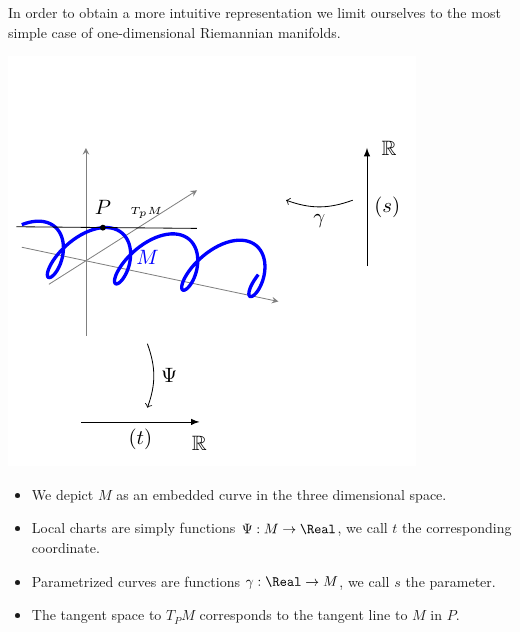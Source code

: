 \documentclass[Main]{subfiles}
\begin{document}
		\vspace{2mm}
		In order to obtain a more intuitive representation we limit ourselves to the most simple case of one-dimensional Riemannian manifolds.

		\vspace{1mm}		
		\begin{minipage}{0.5\textwidth}
			\includegraphics[width=\textwidth]{Pictures/Jacobi1D_GeometricPicture0}
		\end{minipage}
		\begin{minipage}{0.5\textwidth}
			\begin{itemize}
				\item We depict $M$ as an embedded curve in the three dimensional space.
				\item Local charts are simply functions $\Psi: M \rightarrow \Real$, we call $t$ the corresponding coordinate.
				\item Parametrized curves are functions $\gamma: \Real \rightarrow M$, we call $s$ the parameter.
				\item The tangent space to $T_P M$ corresponds to the tangent line to $M$ in $P$.
			\end{itemize}
		\end{minipage}
		\vspace{1mm}\\	
		
\end{document}
